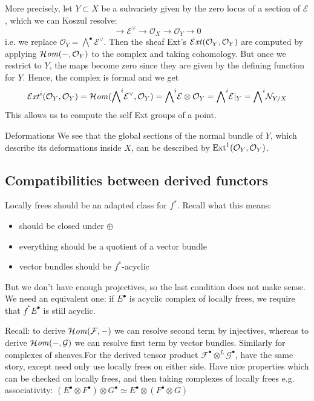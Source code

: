 More precisely, let $Y\subset X$ be a subvariety given by the zero locus of a section of $\mathcal{E}$, which we can Koszul resolve: $$\xrightarrow{}\mathcal{E}^\lor\xrightarrow{}\mathcal{O}_{X}\xrightarrow{}\mathcal{O}_{Y}\xrightarrow{}0$$i.e. we replace $\mathcal{O}_{Y}={\bigwedge}^\bullet \mathcal{E}^\lor$. Then the sheaf Ext's $\operatorname{\mathcal{E}\mathit{xt}}(\mathcal{O}_{Y},\mathcal{O}_{Y})$ are computed by applying $\operatorname{\mathcal{H}\mathit{om}}(-,\mathcal{O}_{Y})$ to the complex and taking cohomology. But once we restrict to $Y$, the maps become zero since they are given by the defining function for $Y$. Hence, the complex is formal and we get $$\operatorname{\mathcal{E}\mathit{xt}}^i(\mathcal{O}_{Y},\mathcal{O}_{Y})=\operatorname{\mathcal{H}\mathit{om}}({\bigwedge}^i \mathcal{E}^\lor, \mathcal{O}_{Y})={\bigwedge}^i \mathcal{E} \otimes \mathcal{O}_{Y}={\bigwedge}^i \mathcal{E}|_{Y}={\bigwedge}^i \mathcal{N}_{{Y/X}}$$
This allows us to compute the self Ext groups of a point.

\begin{remark}{Deformations}{}
    We see that the global sections of the normal bundle of $Y$, which describe its deformations inside $X$, can be described by $\operatorname{Ext}^1(\mathcal{O}_Y,\mathcal{O}_Y)$. 
    
\end{remark}

\subsection{Compatibilities between derived functors}

Locally frees should be an adapted class for $f^*$. Recall what this means: 
\begin{itemize}
    \item should be closed under $\oplus$
    \item everything should be a quotient of a vector bundle
    \item vector bundles should be $f^*$-acyclic
\end{itemize}

But we don't have enough projectives, so the last condition does not make sense. We need an equivalent one: if $E^\bullet$ is acyclic complex of locally frees, we require that $f^*E^\bullet$ is still acyclic.

Recall: to derive $\operatorname{\mathcal{H}\mathit{om}}(\mathcal{F}, -)$ we can resolve second term by injectives, whereas to derive $\operatorname{\mathcal{H}\mathit{om}}(-,\mathcal{G})$ we can resolve first term by vector bundles. Similarly for complexes of sheaves.For the derived tensor product $\mathcal{F}^\bullet\otimes^L \mathcal{G}^\bullet$, have the same story, except need only use locally frees on either side. Have nice properties which can be checked on locally frees, and then taking complexes of locally frees e.g. associativity: $(E^\bullet \otimes F^\bullet ) \otimes G^\bullet \simeq E^\bullet \otimes (F^\bullet \otimes G)$

